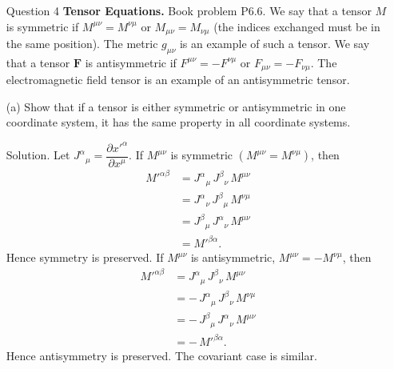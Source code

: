 \documentclass[12pt]{article}
\begin{document}
\begin{enumerate}
  \newpage
  
  \item[Question 4] \textbf{Tensor Equations.} Book problem P6.6. We say that a tensor $M$ is symmetric if $M^{\mu \nu}=M^{\nu \mu}$ or $M_{\mu \nu}=M_{\nu \mu}$ (the indices exchanged must be in the same position). The metric $g_{\mu \nu}$ is an example of such a tensor. We say that a tensor $\boldsymbol{F}$ is antisymmetric if $F^{\mu \nu}=-F^{\nu \mu}$ or $F_{\mu \nu}=-F_{\nu \mu}$. The electromagnetic field tensor is an example of an antisymmetric tensor.
  \item[(a)] Show that if a tensor is either symmetric or antisymmetric in one coordinate system, it has the same property in all coordinate systems.
  
  \item[Solution.]  
  Let $J^\alpha{}_\mu=\dfrac{\partial x'^{\alpha}}{\partial x^{\mu}}$. If $M^{\mu\nu}$ is symmetric $(M^{\mu\nu}=M^{\nu\mu})$, then
  $$
  \begin{aligned}
  M'^{\alpha\beta}
  &= J^\alpha{}_\mu\,J^\beta{}_\nu\,M^{\mu\nu} \\
  &= J^\alpha{}_\nu\,J^\beta{}_\mu\,M^{\nu\mu} \\
  &= J^\beta{}_\mu\,J^\alpha{}_\nu\,M^{\mu\nu} \\
  &= M'^{\beta\alpha}.
  \end{aligned}
  $$
  Hence symmetry is preserved. If $M^{\mu\nu}$ is antisymmetric, $M^{\mu\nu}=-M^{\nu\mu}$, then
  $$
  \begin{aligned}
  M'^{\alpha\beta}
  &= J^\alpha{}_\mu\,J^\beta{}_\nu\,M^{\mu\nu} \\
  &= -\,J^\alpha{}_\mu\,J^\beta{}_\nu\,M^{\nu\mu} \\
  &= -\,J^\beta{}_\mu\,J^\alpha{}_\nu\,M^{\mu\nu} \\
  &= -\,M'^{\beta\alpha}.
  \end{aligned}
  $$
  Hence antisymmetry is preserved. The covariant case is similar.





\end{enumerate}
\end{document}

